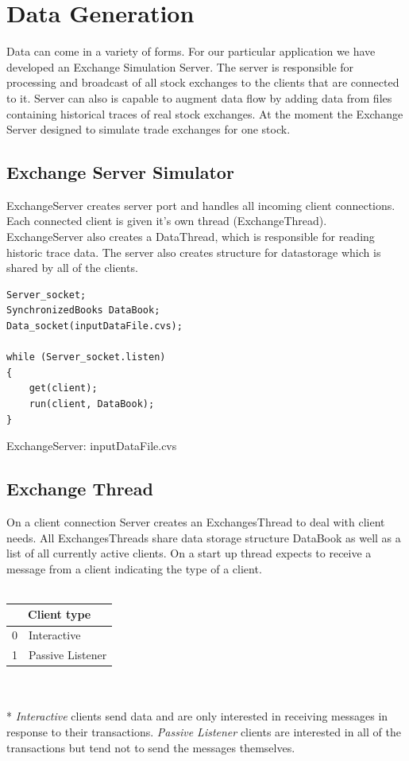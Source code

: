 \documentclass[11pt]{article}
\begin{document}
\section{Data Generation}

Data can come in a variety of forms. For our particular application we have developed an Exchange Simulation Server. The server is responsible for processing and broadcast of all stock exchanges to the clients that are connected to it. Server can also is capable to augment data flow by adding data from files containing historical traces of real stock exchanges. At the moment the Exchange Server designed to simulate trade exchanges for one stock.   

\subsection{Exchange Server Simulator}
ExchangeServer creates server port and handles all incoming client connections. Each connected client is given it's own thread (ExchangeThread). ExchangeServer also creates a DataThread, which is responsible for reading historic trace data. The server also creates structure for datastorage which is shared by all of the clients.

\begin{code}
  \begin{verbatim}
Server_socket;
SynchronizedBooks DataBook;
Data_socket(inputDataFile.cvs);

while (Server_socket.listen)
{
	get(client);
	run(client, DataBook);
}
  \end{verbatim}
  \caption{ExchangeServer: inputDataFile.cvs}
\end{code}



\subsection{Exchange Thread}
On a client connection Server creates an ExchangesThread to deal with client needs. All ExchangesThreads share data storage structure DataBook as well as a list of all currently active clients. On a start up thread expects to receive a message from a client indicating the type of a client.
\\
\\
\begin{tabular}{|l|l|}
  \hline
  \multicolumn{2}{|c|}{Client type} \\
  \hline
  0 & Interactive\\ \hline
  1 & Passive Listener \\
  \hline
\end{tabular}
\\
\\*
\emph{Interactive} clients send data and are only interested in receiving messages in response to their transactions. \emph{Passive Listener} clients are interested in all of the transactions but tend not to send the messages themselves.
\end{document}

